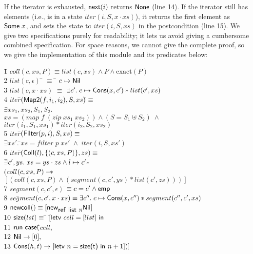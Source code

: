 \documentclass[preprint,natbib]{sigplanconf}
\begin{document}
If the iterator is exhausted, $\mbox{\textsf{{next}}}(i)$ returns $\mbox{\textsf{{None}}}$
(line 14). If the iterator still has elements (i.e., is in a state
$iter(i, S, x\cdot xs)$), it returns the first element as
$\mbox{\textsf{{Some}}}\;x$, and sets the state to $iter(i, S, xs)$ in the
postcondition (line 15). We give two specifications purely for
readability; it lets us avoid giving a cumbersome combined
specification.
%
For space reasons, we cannot give the complete proof, so we give the
implementation of this module and its predicates below:
{\small
\begin{tabbing}
1\qquad \= $coll$\=$(c, xs, P) \equiv list(c, xs) \land P \land \mbox{exact}(P)$ \\[0.5em]
2 \> $list(c, \epsilon)$ \qquad\= $\equiv$ \= $c \mapsto \mbox{\textsf{{Nil}}}$ \\
3 \> $list(c, x\cdot xs)$ \> $\equiv$ \> 
   $\exists c'.\; c \mapsto \mbox{\textsf{{Cons}}}(x, c') * list(c', xs)$ 
\\[0.5em]
4 \> $iter$\=$(\mbox{\textsf{{Map2}}}(f, i_1, i_2), S, xs)$\=$ \equiv$ \= \\ 
\> \>         $\exists$\=$xs_1, xs_2, S_1, S_2.$ \\
\> \>\>$xs = (map\; f\; (zip\; xs_1\; xs_2)) \land (S = S_1 \uplus S_2) \;\land$\\
\> \>\>$iter(i_1, S_1, xs_1) * iter(i_2, S_2, xs_2)$ \\
5 \> $iter$\=$(\mbox{\textsf{{Filter}}}(p, i), S, xs) \equiv$ \\
\> \>\>      $\exists xs'.\;$\=$xs = filter\;p\;xs' \;\land\; iter(i, S, xs')$ \\
6 \> $iter$\=$(\mbox{\textsf{{Coll}}}(l), \{{(c, xs, P)}\}, zs) \equiv$ \= \\
\> \> $\exists$\=$ c', ys.\; xs = ys \cdot zs \land l \mapsto c' * $ \\
\> \> $(coll$\=$(c, xs, P) -\!\!*\;$\\ 
\> \> \> \!\!\!\!$[(coll(c, xs, P) \land (segment(c, c', ys) * list(c', zs)))]$
\\[0.5em]
7 \> $segment(c, c', \epsilon)$ \qquad\=$\equiv c = c' \land \mathsf{emp}$ \\
8 \> $seg$\=$ment(c, c', x\cdot xs) \equiv \exists c''.\; c \mapsto \mbox{\textsf{{Cons}}}(x, c'') * segment(c'', c', xs)$
\\[0.5em]

9 \> $\mbox{\textsf{{newcoll}}}() \equiv [\mbox{\textsf{{new}}}_{\mbox{\textsf{{ref }}}\mbox{\textsf{{list }}}{\mathbb{N}}} \mbox{\textsf{{Nil}}}]$ 
\\[0.5em]
10 \> $\mbox{\textsf{{size}}}(lst) \equiv$ \=  $[$\=$ \mbox{\textsf{{letv }}}cell = [!lst]\mbox{\textsf{{ in }}}$ \\
11 \> \> \> $\mbox{\textsf{{run }}}{}\mbox{\textsf{{case}}}($\=$cell,$ \\
12 \> \> \> \> $\mbox{\textsf{{Nil}}} \to [0], $ \\
13 \> \> \> \> $\mbox{\textsf{{Cons}}}(h,t) \to [\mbox{\textsf{{letv }}}n = \mbox{\textsf{{size(t)}}}\mbox{\textsf{{ in }}}n + 1])]$ 
\\[0.5em]


\end{tabbing}}
\end{document}
